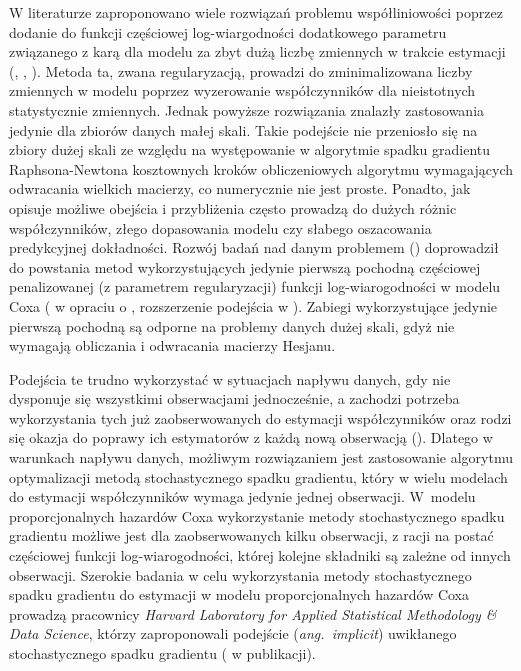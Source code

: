 W literaturze zaproponowano wiele rozwiązań problemu współliniowości poprzez dodanie do funkcji częściowej log-wiargodności dodatkowego parametru związanego z karą dla modelu za zbyt dużą liczbę zmiennych w trakcie estymacji (\cite{parkm}, \cite{sohn}, \cite{goemann}). Metoda ta, zwana regularyzacją, prowadzi do zminimalizowana liczby zmiennych w modelu poprzez wyzerowanie współczynników dla nieistotnych statystycznie zmiennych. Jednak powyższe rozwiązania znalazły zastosowania jedynie dla zbiorów danych małej skali. Takie podejście nie przeniosło się na zbiory dużej skali ze względu na występowanie w algorytmie spadku gradientu Raphsona-Newtona kosztownych kroków obliczeniowych algorytmu wymagających odwracania wielkich macierzy, co numerycznie nie jest proste. Ponadto, jak opisuje \cite{mital} możliwe obejścia i przybliżenia często prowadzą do dużych różnic współczynników, złego dopasowania modelu czy słabego oszacowania predykcyjnej dokładności. Rozwój badań nad danym problemem (\cite{KIMKIM}) doprowadził do powstania metod wykorzystujących jedynie pierwszą pochodną częściowej penalizowanej (z parametrem regularyzacji) funkcji log-wiarogodności w modelu Coxa (\cite{sohn} w opraciu o \cite{KIM}, rozszerzenie podejścia w \cite{mital}). Zabiegi wykorzystujące jedynie pierwszą pochodną są odporne na problemy danych dużej skali, gdyż nie wymagają obliczania i odwracania macierzy Hesjanu. 

Podejścia te trudno wykorzystać w sytuacjach napływu danych, gdy nie dysponuje się wszystkimi obserwacjami jednocześnie, a zachodzi potrzeba wykorzystania tych już zaobserwowanych do estymacji współczynników oraz rodzi się okazja do poprawy ich estymatorów z każdą nową obserwacją (\cite{bottDOD}). Dlatego w warunkach napływu danych, możliwym rozwiązaniem jest zastosowanie algorytmu optymalizacji metodą stochastycznego spadku gradientu, który w wielu modelach do estymacji współczynników wymaga jedynie jednej obserwacji. W~modelu proporcjonalnych hazardów Coxa wykorzystanie metody stochastycznego spadku gradientu możliwe jest dla zaobserwowanych kilku obserwacji, z racji na postać częściowej funkcji log-wiarogodności, której kolejne składniki są zależne od innych obserwacji. Szerokie badania w celu wykorzystania metody stochastycznego spadku gradientu do estymacji w modelu proporcjonalnych hazardów Coxa prowadzą pracownicy \textit{Harvard Laboratory for Applied Statistical Methodology \& Data Science}, którzy zaproponowali podejście (\textit{ang.~implicit}) uwikłanego stochastycznego spadku gradientu (\cite{toulis} w publikacji).  

